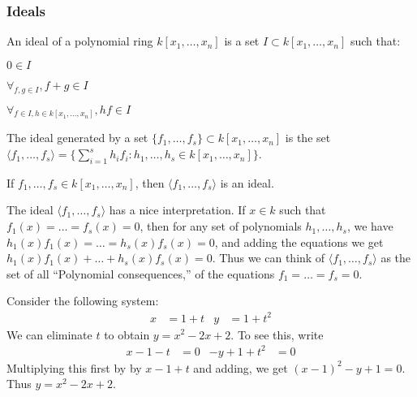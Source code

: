             \subsubsection{Ideals}
                \begin{definition}
                    An ideal of a polynomial ring
                    $k[x_1,\hdots ,x_n]$ is a set
                    $I\subset k[x_1,\hdots ,x_n]$ such that:
                    \begin{enumerate}
                        \begin{multicols}{3}
                            \item $0\in I$
                            \item $\forall_{f,g\in I}, f+g\in I$ 
                            \item $\forall_{f\in I, h\in k[x_1,\hdots ,x_n]},%
                                   hf\in I$
                        \end{multicols}
                    \end{enumerate}
                \end{definition}
                \begin{definition}
                    The ideal generated by a set
                    $\{f_1,\hdots, f_s\}\subset k[x_1,\hdots ,x_n]$
                    is the set
                    $\langle f_1,\hdots,f_s\rangle%
                     =\{\sum_{i=1}^{s} h_i f_i:%
                        h_1,\hdots,h_s\in k[x_1,\hdots ,x_n]\}$.
                \end{definition}
                \begin{theorem}
                    If $f_1,\hdots, f_s\in k[x_1,\hdots ,x_n]$,
                    then $\langle f_1,\hdots, f_s\rangle$ is an ideal.
                \end{theorem}
                The ideal $\langle f_1,\hdots, f_s\rangle$ has a nice
                    interpretation. If $x\in k$ such that
                $f_1(x)=\hdots=f_s(x)=0$, then for any set of polynomials
                $h_1,\hdots, h_s$, we have
                $h_1(x)f_1(x)=\hdots=h_s(x)f_s(x)=0$, and adding the
                equations we get
                $h_1(x)f_1(x)+\hdots+h_s(x)f_s(x)=0$. Thus we can think of
                $\langle f_1,\hdots,f_s\rangle$ as the set of all
                ``Polynomial consequences,'' of the equations
                $f_1=\hdots=f_s=0$.
                \begin{example}
                    Consider the following system:
                    \begin{align*}
                        x&=1+t&y&=1+t^{2}
                    \end{align*}
                    We can eliminate $t$ to obtain $y=x^2-2x+2$.
                    To see this, write
                    \begin{align*}
                        x-1-t&=0&-y+1+t^{2}&=0
                    \end{align*}
                    Multiplying this first by by $x-1+t$ and adding, we get
                    $(x-1)^2-y+1=0$. Thus $y=x^2-2x+2$.
                \end{example}
